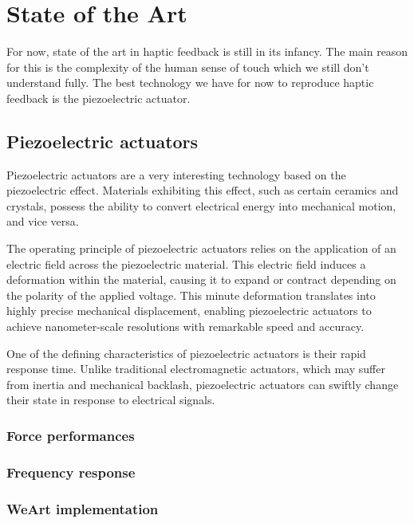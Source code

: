 \section{State of the Art}
For now, state of the art in haptic feedback is still in its infancy.
The main reason for this is the complexity of the human sense of touch which we still don't understand fully.
The best technology we have for now to reproduce haptic feedback is the piezoelectric actuator.

\subsection{Piezoelectric actuators}
Piezoelectric actuators are a very interesting technology based on the piezoelectric effect.
Materials exhibiting this effect, such as certain ceramics and crystals, possess the ability to convert electrical energy into mechanical motion, and vice versa.

The operating principle of piezoelectric actuators relies on the application of an electric field across the piezoelectric material. This electric field induces a deformation within the material, causing it to expand or contract depending on the polarity of the applied voltage. This minute deformation translates into highly precise mechanical displacement, enabling piezoelectric actuators to achieve nanometer-scale resolutions with remarkable speed and accuracy.

One of the defining characteristics of piezoelectric actuators is their rapid response time. Unlike traditional electromagnetic actuators, which may suffer from inertia and mechanical backlash, piezoelectric actuators can swiftly change their state in response to electrical signals.


\subsubsection{Force performances}

\subsubsection{Frequency response}

\subsubsection{WeArt implementation}

